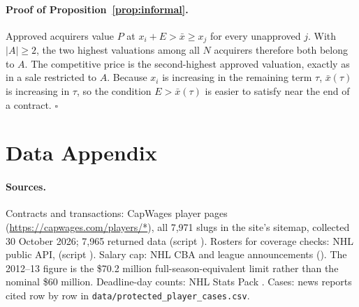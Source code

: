 \paragraph{Proof of Proposition~\ref{prop:informal}.} Approved acquirers value $P$ at $x_i+E>\bar x\ge x_j$ for every unapproved $j$. With $|A|\ge2$, the two highest valuations among all $N$ acquirers therefore both belong to $A$. The competitive price is the second-highest approved valuation, exactly as in a sale restricted to $A$. Because $x_i$ is increasing in the remaining term $\tau$, $\bar x(\tau)$ is increasing in $\tau$, so the condition $E>\bar x(\tau)$ is easier to satisfy near the end of a contract. $\square$

\section{Data Appendix}\label{app:data}

\paragraph{Sources.} Contracts and transactions: CapWages player pages (\url{https://capwages.com/players/*}), all 7,971 slugs in the site's sitemap, collected 30 October 2026; 7,965 returned data (script ). Rosters for coverage checks: NHL public API,  (script ). Salary cap: NHL CBA and league announcements (). The 2012--13 figure is the \$70.2 million full-season-equivalent limit rather than the nominal \$60 million. Deadline-day counts: NHL Stats Pack \citep{nhl_statspack}. Cases: news reports cited row by row in \texttt{data/protected\_player\_cases.csv}.

